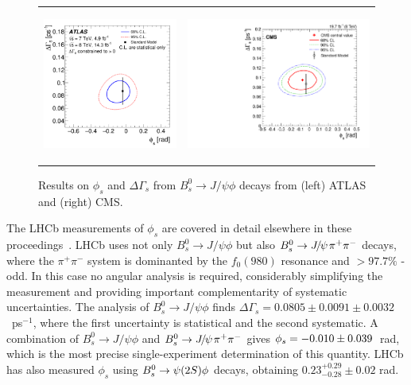 \begin{figure}
  \begin{center}
    \begin{tabular}{c c}
      \includegraphics[height=5cm]{figs/atlas_phis_result.pdf} &
      \includegraphics[height=5cm]{figs/cms_phis_result.pdf} 
    \end{tabular}
  \end{center}
  \caption{\label{phis_atlas_cms}Results on $\phi_s$ and $\Delta\Gamma_s$ from
  $B^0_s \to J/\psi \phi$ decays from (left) ATLAS and (right) CMS.}
\end{figure}

The LHCb measurements of $\phi_s$ are covered in detail elsewhere in these proceedings~\cite{LHCBPHISPROC}.
LHCb uses not only $B^0_s \to J/\psi \phi$ but also ${{B}^0_{s}}\rightarrow {\ensuremath{{J\mskip -3mu/\mskip -2mu\psi\mskip 2mu}}}\pi^+\pi^-$ decays,
where the $\pi^+\pi^-$ system is dominanted by the $f_0(980)$ resonance and $>97.7\%$ \CP-odd.
In this case no angular analysis is required, considerably simplifying the measurement
and providing important complementarity of systematic uncertainties.
The analysis of $B^0_s \to J/\psi \phi$ finds $\Delta\Gamma_s = 0.0805  \pm 0.0091         \pm  0.0032$~ps$^{-1}$,
where the first uncertainty is statistical and the second systematic. 
A combination of $B^0_s \to J/\psi \phi$ and ${{B}^0_{s}}\rightarrow {\ensuremath{{J\mskip -3mu/\mskip -2mu\psi\mskip 2mu}}}\pi^+\pi^-$ gives ${\phi_{{s}}} = -0.010  \pm  0.039$~rad, which is the most 
precise single-experiment determination of this quantity.
LHCb has also measured $\phi_s$ using ${{B}^0_{s}}\rightarrow \psi(2S)\phi$ decays, obtaining
$0.23^{+0.29}_{-0.28} \pm 0.02$ rad.

